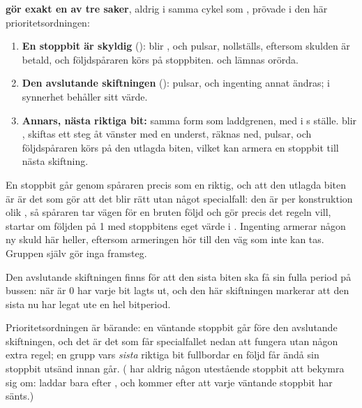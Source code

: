 \textbf{ gör exakt en av tre saker}, aldrig i samma cykel som , prövade
i den här prioritetsordningen:
\begin{enumerate}
  \item \textbf{En stoppbit är skyldig} ():  blir
    ,  och  pulsar,  nollställs,
    eftersom skulden är betald, och följdspåraren körs på stoppbiten.  och
     lämnas orörda.
  \item \textbf{Den avslutande skiftningen} ():  pulsar, och
    ingenting annat ändras;  i synnerhet behåller sitt värde.
  \item \textbf{Annars, nästa riktiga bit:} samma form som laddgrenen, med  i
    s ställe.  blir ,  skiftas ett steg
    åt vänster med en  underst,  räknas ned,  pulsar, och
    följdspåraren körs på den utlagda biten, vilket kan armera en stoppbit till nästa skiftning.
\end{enumerate}

En stoppbit går genom spåraren precis som en riktig, och att den utlagda biten är 
är det som gör att det blir rätt utan något specialfall: den är per konstruktion olik
, så spåraren tar vägen för en bruten följd och gör precis det regeln vill, startar om
följden på 1 med stoppbitens eget värde i . Ingenting armerar någon ny skuld här
heller, eftersom armeringen hör till den väg som inte kan tas. Gruppen själv gör inga framsteg.

Den avslutande skiftningen finns för att den sista biten ska få sin fulla period på bussen: när
 är 0 har varje bit lagts ut, och den här skiftningen markerar att den sista nu har
legat ute en hel bitperiod.

Prioritetsordningen är bärande: en väntande stoppbit går före den avslutande skiftningen, och det är
det som får specialfallet nedan att fungera utan någon extra regel; en grupp vars \emph{sista}
riktiga bit fullbordar en följd får ändå sin stoppbit utsänd innan  går. ( har
aldrig någon utestående stoppbit att bekymra sig om:  laddar bara efter
, och  kommer efter att varje väntande stoppbit har sänts.)

